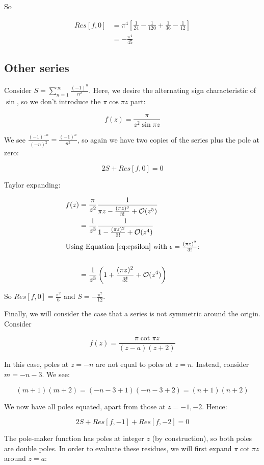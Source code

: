 \documentclass{physics_notes}
\begin{document}
So 

\begin{align*}
	Res[f,0] &= \pi^4 \left[\frac{1}{24} - \frac{1}{120} + \frac{1}{36} - \frac{1}{12}\right] \\
	&= -\frac{\pi^4}{45}
\end{align*}

\subsection{Other series}

Consider $S = \sum_{n=1}^\infty \frac{(-1)^n}{n^2}$. Here, we desire the alternating sign characteristic of $\sin{}$, so we don't introduce the $\pi\cos{\pi z}$ part:

\[ f(z) = \frac{\pi}{z^2\sin{\pi z}} \]

We see $\frac{(-1)^{-n}}{(-n)^2} = \frac{(-1)^n}{n^2}$, so again we have two copies of the series plus the pole at zero:

\[ 2S + Res[f,0] = 0 \]

Taylor expanding:

\begin{align*}
	f(z) &= \frac{\pi}{z^2} \frac{1}{\pi z - \frac{(\pi z)^3}{3!} + \mathcal{O}(z^5)} \\
	&= \frac{1}{z^3} \frac{1}{1 - \frac{(\pi z)^2}{3!} + \mathcal{O}(z^4)} \\
	\intertext{Using Equation \ref{eq:epsilon} with $\epsilon = \frac{(\pi z)^2}{3!}$:} \\
	&= \frac{1}{z^3}\left(1 + \frac{(\pi z)^2}{3!} + \mathcal{O}(z^4)\right)
\end{align*}

So $Res[f,0] = \frac{\pi^2}{6}$ and $S = -\frac{\pi^2}{12}$. 

Finally, we will consider the case that a series is not symmetric around the origin. Consider 

\[ f(z) = \frac{\pi\cot{\pi z}}{(z-a)(z+2)} \]

In this case, poles at $z = -n$ are not equal to poles at $z = n$. Instead, consider $m = -n-3$. We see:

\[ (m+1)(m+2) = (-n-3+1)(-n-3+2) = (n+1)(n+2) \]

We now have all poles equated, apart from those at $z=-1, -2$. Hence:

\[ 2S + Res[f,-1] + Res[f,-2] = 0 \]

The pole-maker function has poles at integer $z$ (by construction), so both poles are double poles. In order to evaluate these residues, we will first expand $\pi \cot{\pi z}$ around $z = a$:
\end{document}

